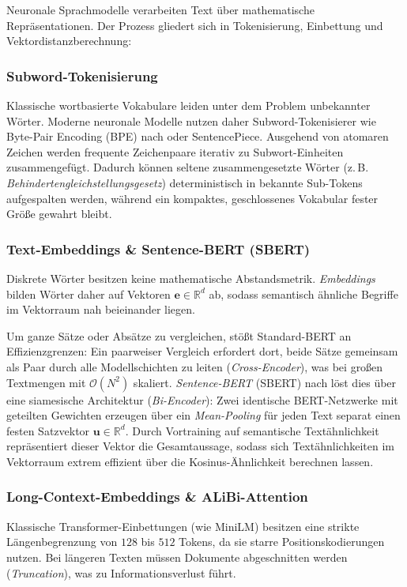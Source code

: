 Neuronale Sprachmodelle verarbeiten Text über mathematische Repräsentationen. Der Prozess gliedert sich in Tokenisierung, Einbettung und Vektordistanzberechnung:

\subsubsection{Subword-Tokenisierung}
Klassische wortbasierte Vokabulare leiden unter dem Problem unbekannter Wörter. Moderne neuronale Modelle nutzen daher Subword-Tokenisierer wie Byte-Pair Encoding (BPE) nach \citet{sennrich2016neural} oder SentencePiece. Ausgehend von atomaren Zeichen werden frequente Zeichenpaare iterativ zu Subwort-Einheiten zusammengefügt. Dadurch können seltene zusammengesetzte Wörter (z.\,B. \textit{Behindertengleichstellungsgesetz}) deterministisch in bekannte Sub-Tokens aufgespalten werden, während ein kompaktes, geschlossenes Vokabular fester Größe gewahrt bleibt.

\subsubsection{Text-Embeddings \& Sentence-BERT (SBERT)}
Diskrete Wörter besitzen keine mathematische Abstandsmetrik. \textit{Embeddings} bilden Wörter daher auf Vektoren $\mathbf{e} \in \mathbb{R}^d$ ab, sodass semantisch ähnliche Begriffe im Vektorraum nah beieinander liegen.

Um ganze Sätze oder Absätze zu vergleichen, stößt Standard-BERT \citep{devlin2019bert} an Effizienzgrenzen: Ein paarweiser Vergleich erfordert dort, beide Sätze gemeinsam als Paar durch alle Modellschichten zu leiten (\textit{Cross-Encoder}), was bei großen Textmengen mit $\mathcal{O}(N^2)$ skaliert. \textit{Sentence-BERT} (SBERT) nach \citet{reimers2019sentence} löst dies über eine siamesische Architektur (\textit{Bi-Encoder}): Zwei identische BERT-Netzwerke mit geteilten Gewichten erzeugen über ein \textit{Mean-Pooling} für jeden Text separat einen festen Satzvektor $\mathbf{u} \in \mathbb{R}^d$. Durch Vortraining auf semantische Textähnlichkeit repräsentiert dieser Vektor die Gesamtaussage, sodass sich Textähnlichkeiten im Vektorraum extrem effizient über die Kosinus-Ähnlichkeit berechnen lassen.

\subsubsection{Long-Context-Embeddings \& ALiBi-Attention}
Klassische Transformer-Einbettungen (wie MiniLM) besitzen eine strikte Längenbegrenzung von $128$ bis $512$ Tokens, da sie starre Positionskodierungen nutzen. Bei längeren Texten müssen Dokumente abgeschnitten werden (\textit{Truncation}), was zu Informationsverlust führt.

